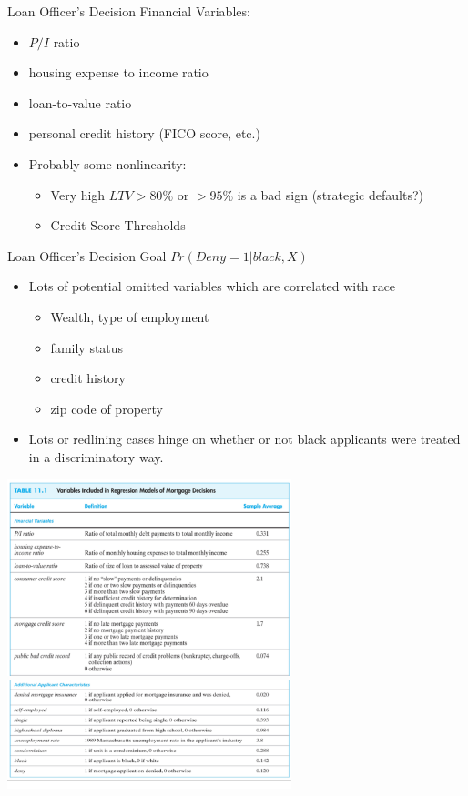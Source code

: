 \documentclass[aspectratio=169]{beamer}
\begin{document}
\begin{frame}{Loan Officer's Decision}
Financial Variables:
\begin{itemize}
\item $P/I$ ratio
\item housing expense to income ratio
\item loan-to-value ratio
\item personal credit history (FICO score, etc.)
\item Probably some nonlinearity:
\begin{itemize}
\item Very high $LTV > 80\%$ or $>95\%$ is a bad sign (strategic defaults?)
\item Credit Score Thresholds
\end{itemize}
\end{itemize}
\end{frame}


\begin{frame}{Loan Officer's Decision}
Goal $Pr(Deny=1 | black, X)$\\

\begin{itemize}
\item Lots of potential \alert{omitted variables} which are correlated with race
\begin{itemize}
\item Wealth, type of employment
\item family status
\item credit history
\item zip code of property
\end{itemize}
\item Lots or \alert{redlining} cases hinge on whether or not black applicants were treated in a discriminatory way.
\end{itemize}
\end{frame}

\begin{frame}
\begin{center}
\includegraphics[width=3.25in]{resources/hmda1.pdf}\\
\includegraphics[width=3.25in]{resources/hmda2.pdf}
\end{center}
\end{frame}
\end{document}
